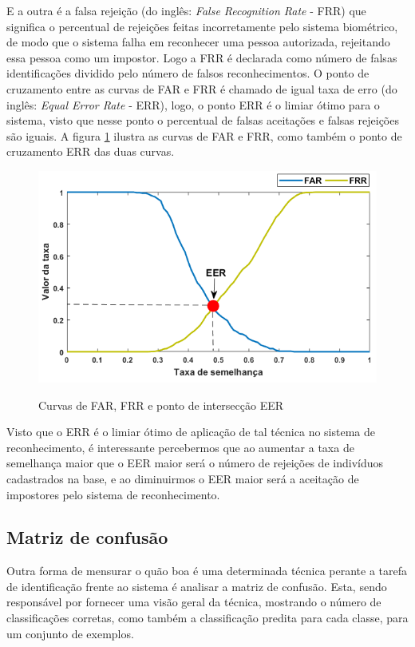 E a outra é a falsa rejeição (do inglês: \textit{False Recognition Rate} - FRR) que significa o percentual de rejeições feitas incorretamente pelo sistema biométrico, de modo que o sistema falha em reconhecer uma pessoa autorizada, rejeitando essa pessoa como um impostor. Logo a FRR é declarada como número de falsas identificações dividido pelo número de falsos reconhecimentos. O ponto de cruzamento entre as curvas de FAR e FRR é chamado de igual taxa de erro (do inglês: \textit{Equal Error Rate} - ERR), logo, o ponto ERR é o limiar ótimo para o sistema, visto que nesse ponto o percentual de falsas aceitações e falsas rejeições são iguais. A figura \ref{fig:FAR_FRR_ERR} ilustra as curvas de FAR e FRR, como também o ponto de cruzamento ERR das duas curvas.


\begin{figure}[H]
\centering
\caption{Curvas de FAR, FRR e ponto de intersecção EER }
\includegraphics[scale = 0.70]{imgs4/FAR_FRR_ERR}
\label{fig:FAR_FRR_ERR}
\end{figure}

Visto que o ERR é o limiar ótimo de aplicação de tal técnica no sistema de reconhecimento, é interessante percebermos que ao aumentar a taxa de semelhança maior que o EER maior será o número de rejeições de indivíduos cadastrados na base, e ao diminuirmos o EER maior será a aceitação de impostores pelo sistema de reconhecimento.

\subsection{Matriz de confusão}

Outra forma de mensurar o quão boa é uma determinada técnica perante a tarefa de identificação frente ao sistema é analisar a matriz de confusão. Esta, sendo responsável por fornecer uma visão geral da técnica, mostrando o número de classificações corretas, como também a classificação predita para cada classe, para um conjunto de exemplos.	


